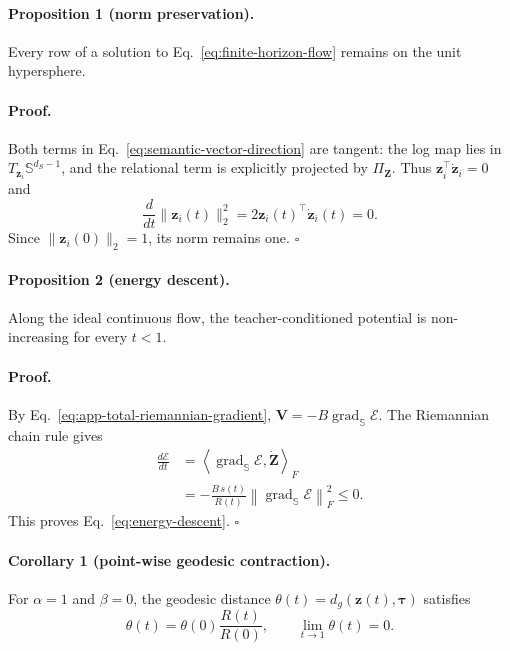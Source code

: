 \paragraph{Proposition 1 (norm preservation).}
Every row of a solution to Eq.~\ref{eq:finite-horizon-flow} remains on the unit
hypersphere.

\paragraph{Proof.}
Both terms in Eq.~\ref{eq:semantic-vector-direction} are tangent: the log map
lies in $T_{\mathbf{z}_i}\mathbb{S}^{d_S-1}$, and the relational term is
explicitly projected by $\Pi_{\mathbf{Z}}$. Thus
$\mathbf{z}_i^\top\dot{\mathbf{z}}_i=0$ and
\begin{equation}
    \frac{d}{dt}
    \lVert\mathbf{z}_i(t)\rVert_2^2
    =
    2\mathbf{z}_i(t)^\top\dot{\mathbf{z}}_i(t)
    =0.
\end{equation}
Since $\lVert\mathbf{z}_i(0)\rVert_2=1$, its norm remains one. \hfill$\square$

\paragraph{Proposition 2 (energy descent).}
Along the ideal continuous flow, the teacher-conditioned potential is
non-increasing for every $t<1$.

\paragraph{Proof.}
By Eq.~\ref{eq:app-total-riemannian-gradient},
$\mathbf{V}=-B\operatorname{grad}_{\mathbb{S}}\mathcal{E}$. The Riemannian
chain rule gives
\begin{align}
    \frac{d\mathcal{E}}{dt}
    &=
    \left\langle
        \operatorname{grad}_{\mathbb{S}}\mathcal{E},
        \dot{\mathbf{Z}}
    \right\rangle_F
    \nonumber\\
    &=
    -\frac{B\,s(t)}{R(t)}
    \left\lVert
        \operatorname{grad}_{\mathbb{S}}\mathcal{E}
    \right\rVert_F^2
    \leq0.
\end{align}
This proves Eq.~\ref{eq:energy-descent}. \hfill$\square$

\paragraph{Corollary 1 (point-wise geodesic contraction).}
For $\alpha=1$ and $\beta=0$, the geodesic distance
$\theta(t)=d_g(\mathbf{z}(t),\boldsymbol{\tau})$ satisfies
\begin{equation}
    \theta(t)
    =
    \theta(0)\frac{R(t)}{R(0)},
    \qquad
    \lim_{t\rightarrow1}\theta(t)=0.
    \label{eq:app-pointwise-contraction}
\end{equation}

